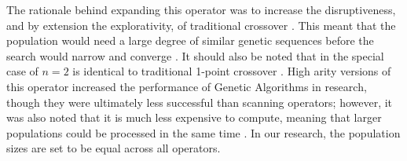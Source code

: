 The rationale behind expanding this operator was to increase the disruptiveness, and by extension the explorativity, of traditional crossover \cite{Eiben97}. This meant that the population would need a large degree of similar genetic sequences before the search would narrow and converge \cite{Eiben95}. It should also be noted that in the special case of $n = 2$ is identical to traditional 1-point crossover \cite{Eiben95}. High arity versions of this operator increased the performance of Genetic Algorithms in research, though they were ultimately less successful than scanning operators; however, it was also noted that it is much less expensive to compute, meaning that larger populations could be processed in the same time \cite{Eiben95}. In our research, the population sizes are set to be equal across all operators.